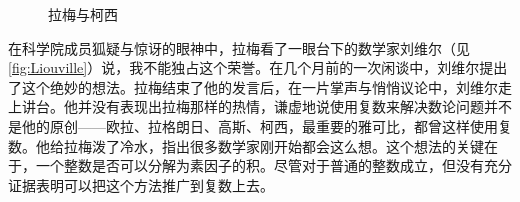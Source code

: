 \documentclass[b5paper]{ctexart}
\begin{document}
\begin{figure}[htbp]
 \centering
 \caption{拉梅与柯西}
\end{figure}

在科学院成员狐疑与惊讶的眼神中，拉梅看了一眼台下的数学家刘维尔（见\cref{fig:Liouville}）说，我不能独占这个荣誉。在几个月前的一次闲谈中，刘维尔提出了这个绝妙的想法。拉梅结束了他的发言后，在一片掌声与悄悄议论中，刘维尔走上讲台。他并没有表现出拉梅那样的热情，谦虚地说使用复数来解决数论问题并不是他的原创——欧拉、拉格朗日、高斯、柯西，最重要的雅可比，都曾这样使用复数。他给拉梅泼了冷水，指出很多数学家刚开始都会这么想。这个想法的关键在于，一个整数是否可以分解为素因子的积。尽管对于普通的整数成立，但没有充分证据表明可以把这个方法推广到复数上去。
\end{document}
